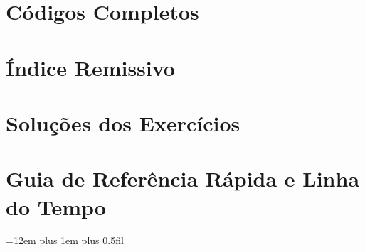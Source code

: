 \documentclass[11pt,fleqn,oneside]{book}
\theoremstyle{definition}
\begin{document}
\newpage
\chapter{Códigos Completos}
\label{ap:codigos}


\newpage
\chapter{Índice Remissivo}
\label{ap:indice}


\newpage
\chapter{Soluções dos Exercícios}
\label{ap:solucoes}


\newpage
\chapter{Guia de Referência Rápida e Linha do Tempo}
\label{ap:cheatsheet}


\newpage
\begingroup
\parindent=0pt
\emergencystretch=12em
\setlength{\leftskip}{0pt}
\rightskip=0pt plus 1em plus 0.5fil
\sloppy


\endgroup
\end{document}
